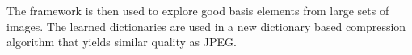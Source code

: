 The framework is then used to explore good basis elements from
large sets of images. 
The learned dictionaries are used in a new dictionary based compression
algorithm that yields similar quality as JPEG.


% 
% 



